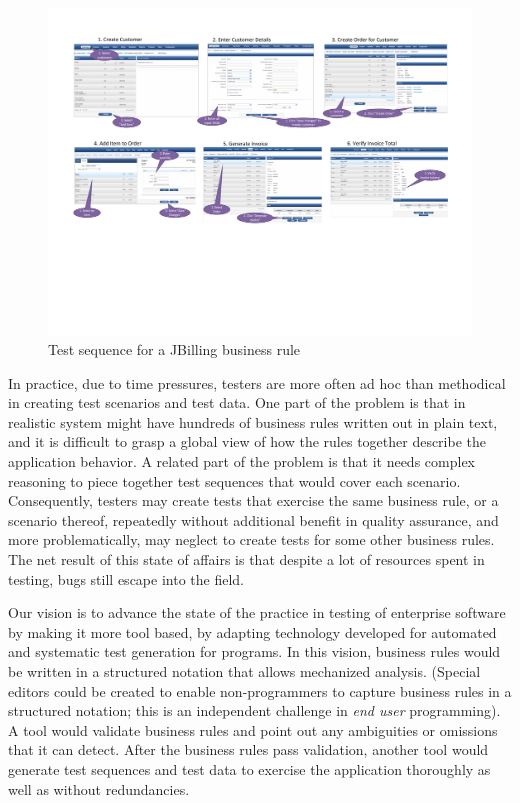 \begin{figure}[t]
\centering
\includegraphics[width=7.5in]{figs/jbilling-flow}
\caption{Test sequence for a JBilling business rule}
\label{fig:jbilling-flow}
\end{figure}

In practice, due to time pressures, testers are more often ad hoc than methodical in creating test 
scenarios and test data.  One part of the problem is that in realistic system might have hundreds of 
business rules written out in plain text, and it is difficult to grasp a global view of how the rules 
together describe the application behavior.  A related part of the problem is that it needs complex 
reasoning to piece together test sequences that would cover each scenario. Consequently, testers may 
create tests that exercise the same business rule, or a scenario thereof, repeatedly without additional 
benefit in quality assurance, and more problematically, may neglect to create tests for some other business 
rules.  The net result of this state of affairs is that despite a lot of resources spent in testing, bugs 
still escape into the field.

Our vision is to advance the state of the practice in testing of enterprise software by making it more
tool based, by adapting technology developed for automated and systematic test generation for programs.  
In this vision, business rules would be written in a structured notation that allows mechanized analysis. 
(Special editors could be created to enable non-programmers to capture business rules in a structured notation; 
this is an independent challenge in \textit{end user} programming).  A tool would validate business rules 
and point out any ambiguities or omissions that it can detect.  After the business rules pass validation, 
another tool would generate test sequences and test data to exercise the application thoroughly as well as
without redundancies.

